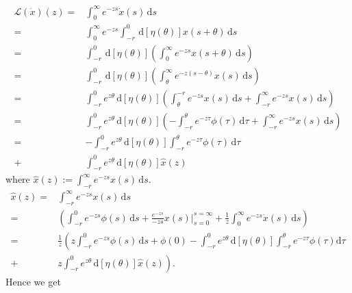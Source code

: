 \begin{equation*}
  \begin{aligned}
    \mathcal{L}(\dot{x})(z)= & \int_0^{\infty}e^{-zs}\dot{x}(s)\,\mathrm{d}s\\
    = &\int_0^{\infty}e^{-zs}\int_{-r}^{0}\,\mathrm{d}[\eta(\theta)]x(s+\theta)\,\mathrm{d}s\\
    = & \int_{-r}^{0}\,\mathrm{d}[\eta(\theta)]\left( \int_0^{\infty}e^{-zs}x(s+\theta)\,\mathrm{d}s \right) \\
    = & \int_{-r}^{0}\,\mathrm{d}[\eta(\theta)] \left( \int_{\theta}^{\infty}e^{-z(s-\theta)}x(s)\,\mathrm{d}s \right) \\
    = & \int_{-r}^{0}e^{z\theta}\,\mathrm{d}[\eta(\theta)]\left( \int_{\theta}^{-r}e^{-zs}x(s)\,\mathrm{d}s+\int_{-r}^{\infty}e^{-zs}x(s)\,\mathrm{d}s \right) \\
    = & \int_{-r}^{0}e^{z\theta}\,\mathrm{d}[\eta(\theta)]\left( -\int_{-r}^{\theta}e^{-z\tau }\phi(\tau )\,\mathrm{d}\tau +\int_{-r}^{\infty}e^{-zs}x(s)\,\mathrm{d}s \right) \\
    = & - \int_{-r}^{0}e^{z\theta}\,\mathrm{d}[\eta(\theta)] \int_{-r}^{\theta}e^{-z\tau }\phi(\tau )\,\mathrm{d}\tau \\
    + & \int_{-r}^{0}e^{z\theta}\,\mathrm{d}[\eta(\theta)]\widehat{x}(z)
  \end{aligned}
\end{equation*}
where $\widehat{x}(z):= \int_{-r}^{\infty}e^{-zs}x(s)\, \mathrm{d}s$.
\begin{equation*}
  \begin{aligned}
    \widehat{x}(z)=& \int_{-r}^{\infty}e^{-zs}x(s)\,\mathrm{d}s\\
    =& \left( \int_{-r}^{0}e^{-zs}\phi(s)\,\mathrm{d}s+ \frac{e^{-zs}}{-zs}x(s)\lvert_{s=0}^{s=\infty} + \frac{1}{z}\int_0^{\infty}e^{-zs}\dot{x}(s)\,\mathrm{d}s \right) \\
    =& \frac{1}{z}\left( z\int_{-r}^{0}e^{-zs}\phi(s)\,\mathrm{d}s+\phi(0)-\int_{-r}^{0}e^{z\theta}\,\mathrm{d}[\eta(\theta)]\int_{-r}^{\theta}e^{-z\tau }\phi(\tau )\mathrm{d}\tau\right.\\
    + &\left. z \int_{-r}^{0}e^{z\theta}\,\mathrm{d}[\eta(\theta)]\widehat{x}(z)\right). 
  \end{aligned}
\end{equation*}
Hence we get 


